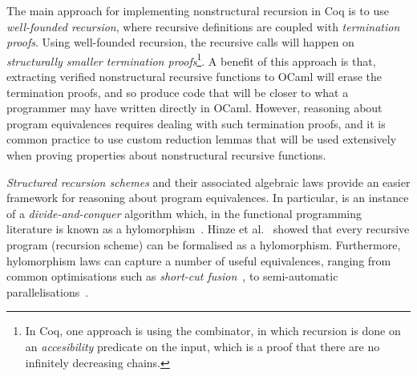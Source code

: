 \documentclass[ a4paper, UKenglish, cleveref, autoref, thm-restate]{lipics-v2021}
\begin{document}
The main approach for implementing nonstructural recursion in Coq is to use
\emph{well-founded recursion}, where recursive definitions are coupled with
\emph{termination proofs}.  Using well-founded recursion, the recursive calls
will happen on \emph{structurally smaller termination proofs}\footnote{In Coq,
one approach is using the  combinator, in which recursion is done on
an \emph{accesibility} predicate on the input, which is a proof that there are
no infinitely decreasing chains.}. A benefit of this approach is that,
extracting verified nonstructural recursive functions to OCaml will erase the
termination proofs, and so produce code that will be closer to what a
programmer may have written directly in OCaml. However, reasoning about program
equivalences requires dealing with such termination proofs, and it is common
practice to use custom reduction lemmas that will be used extensively when
proving properties about nonstructural recursive functions.

\emph{Structured recursion schemes} and their associated algebraic laws provide
an easier framework for reasoning about program equivalences.  In particular,
 is an instance of a \emph{divide-and-conquer}
algorithm which, in the functional programming literature is known as a
hylomorphism~\cite{MeijerFP91, HuIT96}.  Hinze et al.~\cite{HinzeWG15} showed
that every recursive program (recursion scheme) can be formalised as a hylomorphism.
Furthermore, hylomorphism laws can capture a number of useful equivalences,
ranging from common optimisations such as \emph{short-cut
fusion}~\cite{TakanoM95}, to semi-automatic
parallelisations~\cite{Gibbons96:Third, farmsCastro}.
\end{document}
